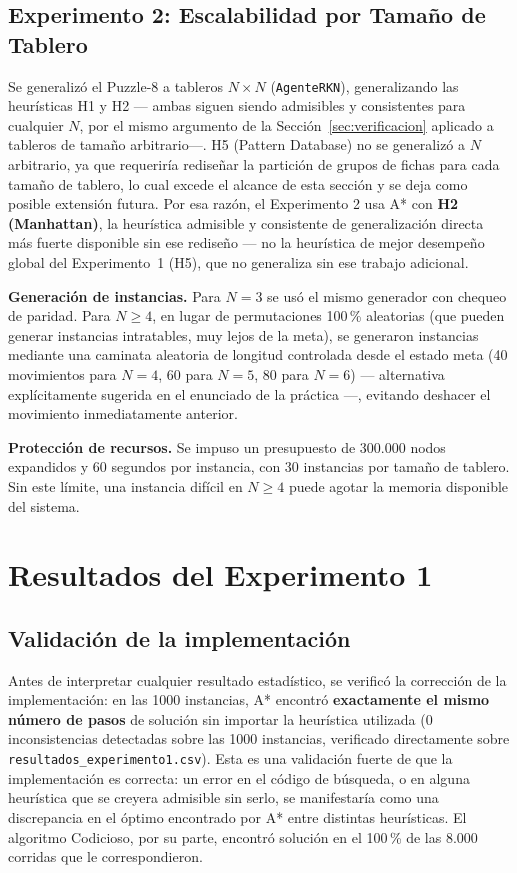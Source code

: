 \documentclass[11pt]{article}
\begin{document}
\subsection{Experimento 2: Escalabilidad por Tamaño de Tablero}
Se generalizó el Puzzle-8 a tableros $N\times N$ (\texttt{AgenteRKN}),
generalizando las heurísticas H1 y H2 --- ambas siguen siendo admisibles y
consistentes para cualquier $N$, por el mismo argumento de la
Sección~\ref{sec:verificacion} aplicado a tableros de tamaño arbitrario---.
H5 (Pattern Database) no se generalizó a $N$ arbitrario, ya que requeriría
rediseñar la partición de grupos de fichas para cada tamaño de tablero, lo
cual excede el alcance de esta sección y se deja como posible extensión
futura. Por esa razón, el Experimento 2 usa A* con \textbf{H2 (Manhattan)},
la heurística admisible y consistente de generalización directa más fuerte
disponible sin ese rediseño --- no la heurística de mejor desempeño global
del Experimento~1 (H5), que no generaliza sin ese trabajo adicional.

\textbf{Generación de instancias.} Para $N=3$ se usó el mismo generador con
chequeo de paridad. Para $N\ge 4$, en lugar de permutaciones 100\,\% aleatorias
(que pueden generar instancias intratables, muy lejos de la meta), se
generaron instancias mediante una caminata aleatoria de longitud controlada
desde el estado meta (40 movimientos para $N=4$, 60 para $N=5$, 80 para
$N=6$) --- alternativa explícitamente sugerida en el enunciado de la
práctica ---, evitando deshacer el movimiento inmediatamente anterior.

\textbf{Protección de recursos.} Se impuso un presupuesto de 300.000 nodos
expandidos y 60 segundos por instancia, con 30 instancias por tamaño de
tablero. Sin este límite, una instancia difícil en $N\ge 4$ puede agotar la
memoria disponible del sistema.

\section{Resultados del Experimento 1}

\subsection{Validación de la implementación}
\label{sec:validacion}
Antes de interpretar cualquier resultado estadístico, se verificó la
corrección de la implementación: en las 1000 instancias, A* encontró
\textbf{exactamente el mismo número de pasos} de solución sin importar la
heurística utilizada (0 inconsistencias detectadas sobre las 1000 instancias,
verificado directamente sobre \texttt{resultados\_experimento1.csv}). Esta es
una validación fuerte de que la implementación es correcta: un error en el
código de búsqueda, o en alguna heurística que se creyera admisible sin
serlo, se manifestaría como una discrepancia en el óptimo encontrado por A*
entre distintas heurísticas. El algoritmo Codicioso, por su parte, encontró
solución en el 100\,\% de las 8.000 corridas que le correspondieron.
\end{document}
